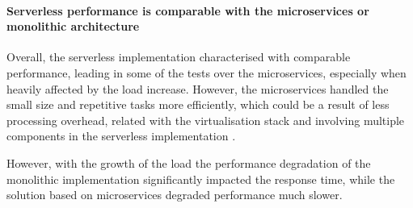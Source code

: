
\paragraph*{Serverless performance is comparable with the microservices or monolithic architecture}

Overall, the serverless implementation characterised with comparable performance, leading in some of the tests over the microservices, especially when heavily affected by the load increase.
However, the microservices handled the small size and repetitive tasks more efficiently, which could be a result of less processing overhead, related with the virtualisation stack and involving multiple components in the serverless implementation \cite{MicroservicesvsServerlessAPerformanceComparisonOnCloudNativeWebApplication}.

However, with the growth of the load the performance degradation of the monolithic implementation significantly impacted the response time, while the solution based on microservices degraded performance much slower. \cite{ServerlessComputingAnInvestigationOfDeploymentEnvironmentsForWebAPIs}






